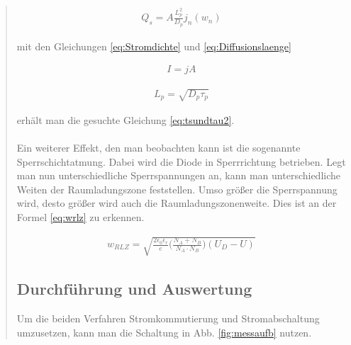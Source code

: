 \begin{quote}
	\begin{equation}
         \begin{split}
             Q_{s}=A\frac{L_{p}^{2}}{D_p}j_{n}(w_n)
             \end{split}
         \label{eq:blalbl}
    \end{equation}
	
	mit den Gleichungen \ref{eq:Stromdichte} und \ref{eq:Diffusionslaenge}
	
	\begin{equation}
         \begin{split}
             I=jA
             \end{split}
         \label{eq:Stromdichte}
    \end{equation}
    
    \begin{equation}
         \begin{split}
             L_{p}=\sqrt{D_{p}\tau_{p}}
             \end{split}
         \label{eq:Diffusionslaenge}
    \end{equation}
    
    erhält man die gesuchte Gleichung \ref{eq:tsundtau2}.\\
   	\\
    Ein weiterer Effekt, den man beobachten kann ist die sogenannte 
    Sperrschichtatmung. Dabei wird die Diode in Sperrrichtung betrieben. Legt 
    man nun unterschiedliche Sperrspannungen an, kann man unterschiedliche
    Weiten der Raumladungszone feststellen. Umso größer die Sperrspannung wird, 
    desto größer wird auch die Raumladungszonenweite. Dies ist an der Formel
    \ref{eq:wrlz} zu erkennen.
    
     \begin{equation}
         \begin{split}
             w_{RLZ}=\sqrt{\frac{2\epsilon_{0}\epsilon_{r}}{e}\bigg(\frac{N_{A}+N_{B}}{N_{A}\cdot N_{B}}\bigg)(U_{D}-U)}
             \end{split}
         \label{eq:wrlz}
    \end{equation}
     
  \subsection{Durchführung und Auswertung}
     
     Um die beiden Verfahren Stromkommutierung und Stromabschaltung umzusetzen, 
     kann man die Schaltung in Abb. \ref{fig:messaufb} nutzen.
	

\end{quote}
